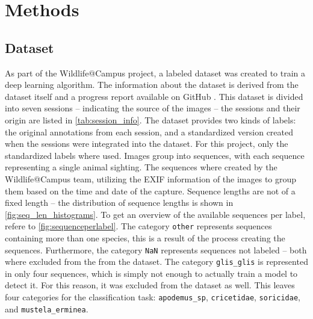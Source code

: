 

\section{Methods}
\label{methods}

    \subsection{Dataset}

    As part of the Wildlife@Campus project, a labeled dataset was created to train a deep learning algorithm.
    The information about the dataset is derived from the dataset itself and a progress report available on GitHub \autocite{ratnaweeraWildlifeCampusProgressReports2021}.
    This dataset is divided into seven sessions -- indicating the source of the images -- the sessions and their origin are listed in \autoref{tab:session_info}.
    The dataset provides two kinds of labels: the original annotations from each session, and a standardized version created when the sessions were integrated into the dataset.
    For this project, only the standardized labels where used.
    Images group into sequences, with each sequence representing a single animal sighting.
    The sequences where created by the Wildlife@Campus team, utilizing the EXIF information of the images to group them based on the time and date of the capture.
    Sequence lengths are not of a fixed length -- the distribution of sequence lengths is shown in \autoref{fig:seq_len_histograms}.
    To get an overview of the available sequences per label, refere to \autoref{fig:sequenceperlabel}.
    The category \texttt{other} represents sequences containing more than one species, this is a result of the process creating the sequences.
    Furthermore, the category \texttt{NaN} represents sequences not labeled -- both where excluded from the from the dataset.
    The category \texttt{glis\_glis} is represented in only four sequences, which is simply not enough to actually train a model to detect it.
    For this reason, it was excluded from the dataset as well.
    This leaves four categories for the classification task: \texttt{apodemus\_sp}, \texttt{cricetidae}, \texttt{soricidae}, and \texttt{mustela\_erminea}.

